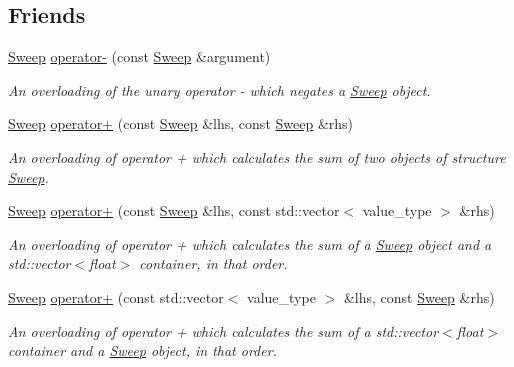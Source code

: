 \subsection*{Friends}
\begin{DoxyCompactItemize}
\item 
\hyperlink{structSweep}{Sweep} \hyperlink{structSweep_a29420e86f220ed305794c8e560059bbc}{operator-\/} (const \hyperlink{structSweep}{Sweep} \&argument)
\begin{DoxyCompactList}\small\item\em An overloading of the unary operator -\/ which negates a {\itshape \hyperlink{structSweep}{Sweep}} object. \end{DoxyCompactList}\item 
\hyperlink{structSweep}{Sweep} \hyperlink{structSweep_a96391241f10ea728ee36b62f6c35d604}{operator+} (const \hyperlink{structSweep}{Sweep} \&lhs, const \hyperlink{structSweep}{Sweep} \&rhs)
\begin{DoxyCompactList}\small\item\em An overloading of operator + which calculates the sum of two objects of structure {\itshape \hyperlink{structSweep}{Sweep}}. \end{DoxyCompactList}\item 
\mbox{\label{structSweep_aeda21a44db5dcd10a43bdaa9c1f28be9}} 
\hyperlink{structSweep}{Sweep} \hyperlink{structSweep_aeda21a44db5dcd10a43bdaa9c1f28be9}{operator+} (const \hyperlink{structSweep}{Sweep} \&lhs, const std\+::vector$<$ value\+\_\+type $>$ \&rhs)
\begin{DoxyCompactList}\small\item\em An overloading of operator + which calculates the sum of a {\itshape \hyperlink{structSweep}{Sweep}} object and a {\ttfamily std\+::vector$<$float$>$} container, in that order. \end{DoxyCompactList}\item 
\mbox{\label{structSweep_a84e1dfaeb206d7bc0c1e8a3a9811af5a}} 
\hyperlink{structSweep}{Sweep} \hyperlink{structSweep_a84e1dfaeb206d7bc0c1e8a3a9811af5a}{operator+} (const std\+::vector$<$ value\+\_\+type $>$ \&lhs, const \hyperlink{structSweep}{Sweep} \&rhs)
\begin{DoxyCompactList}\small\item\em An overloading of operator + which calculates the sum of a {\ttfamily std\+::vector$<$float$>$} container and a {\itshape \hyperlink{structSweep}{Sweep}} object, in that order. \end{DoxyCompactList}\item 

\end{DoxyCompactItemize}
